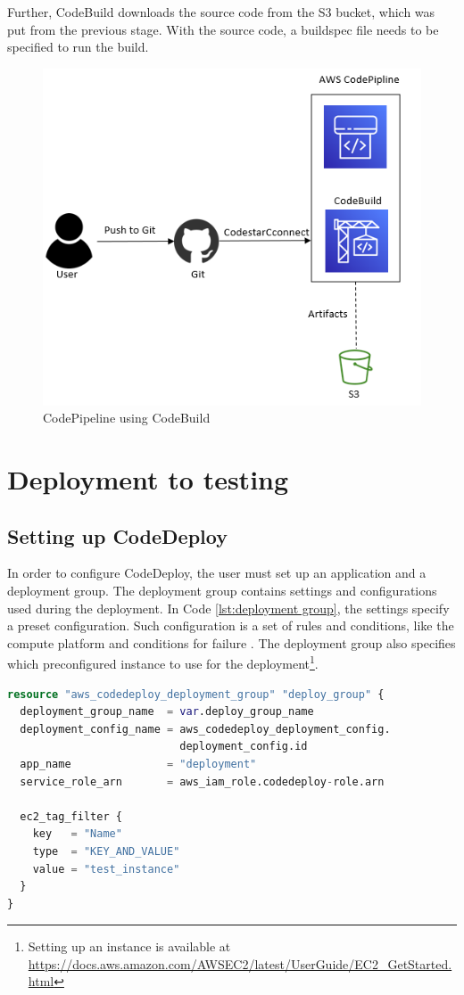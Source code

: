 Further, CodeBuild downloads the source code from the S3 bucket, which was put from the previous stage. With the source code, a \gls{buildspec} file needs to be specified to run the build.

\vspace{2mm}
\begin{figure}[H]
    \centering
    \includegraphics[width=0.6\columnwidth]{Images/aws-piplin-3.png}
    \caption{CodePipeline using CodeBuild}
    \label{fig: CodePipeline using CodeBuild}
\end{figure}

\section{Deployment to testing}
\label{Deployment to testing}
\subsection{Setting up CodeDeploy}
In order to configure CodeDeploy, the user must set up an application and a deployment group. The deployment group contains settings and configurations used during the deployment. In Code \ref{lst:deployment group}, the settings specify a preset configuration. Such configuration is a set of rules and conditions, like the compute platform and conditions for failure \cite{CodeDeployConfig}. The deployment group also specifies which preconfigured instance to use for the deployment\footnote{Setting up an instance is available at \url{https://docs.aws.amazon.com/AWSEC2/latest/UserGuide/EC2_GetStarted.html}}. 

\vspace{2mm}
\begin{lstlisting}[language=terraform, caption=Create the deployment group, captionpos=b, frame=single, label= {lst:deployment group}]
resource "aws_codedeploy_deployment_group" "deploy_group" {
  deployment_group_name  = var.deploy_group_name
  deployment_config_name = aws_codedeploy_deployment_config.
                           deployment_config.id
  app_name               = "deployment"
  service_role_arn       = aws_iam_role.codedeploy-role.arn

  ec2_tag_filter {
    key   = "Name"
    type  = "KEY_AND_VALUE"
    value = "test_instance"
  }
}
\end{lstlisting}

